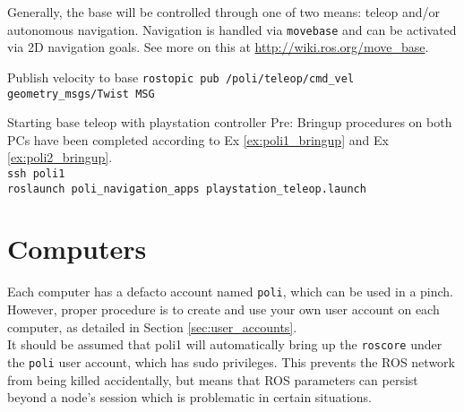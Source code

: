 Generally, the base will be controlled through one of two means: teleop and/or autonomous navigation. 
Navigation is handled via \texttt{movebase} and can be activated via 2D navigation goals. 
See more on this at \href{http://wiki.ros.org/move_base}{http://wiki.ros.org/move\_base}.

\begin{example}{Publish velocity to base}
  \label{ex:base_velocity}
    \texttt{rostopic pub /poli/teleop/cmd\_vel geometry\_msgs/Twist MSG}\\
\end{example}

\begin{example}{Starting base teleop with playstation controller}
  \label{ex:base_teleop}
    Pre: Bringup procedures on both PCs have been completed according to Ex \ref{ex:poli1_bringup} and Ex \ref{ex:poli2_bringup}. \\
    \texttt{ssh poli1} \\ 
    \texttt{roslaunch poli\_navigation\_apps playstation\_teleop.launch} \\

\end{example}


\section{Computers}
Each computer has a defacto account named \texttt{poli}, which can be used in a pinch. 
However, proper procedure is to create and use your own user account on each computer, as detailed in Section \ref{sec:user_accounts}. \\

It should be assumed that poli1 will automatically bring up the \texttt{roscore} under the \texttt{poli} user account, which has sudo privileges. 
This prevents the ROS network from being killed accidentally, but means that ROS parameters can persist beyond a node's session which is problematic in certain situations. \\


